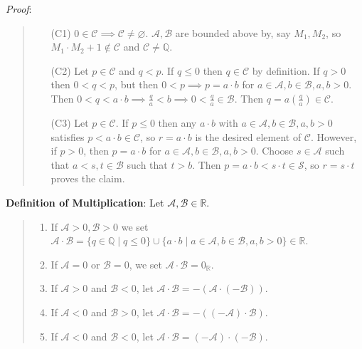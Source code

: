 \documentclass[11pt]{article}
\begin{document}
\emph{Proof}:
\begin{quote}\vspace{-0.3cm}
	\begin{enumerate}
	\item[(C1)] $0 \in \mathcal{C} \implies \mathcal{C} \neq \varnothing$. $\mathcal{A}, \mathcal{B}$ are bounded above by, say $M_1, M_2$, so $M_1 \cdot M_2 + 1 \notin \mathcal{C}$ and $\mathcal{C} \neq \mathbb{Q}$.
	\item[(C2)] Let $p \in \mathcal{C}$ and $q < p$. If $q \leq 0$ then $q \in \mathcal{C}$ by definition. If $q > 0$ then $0 < q < p$, but then $0 < p \implies p = a \cdot b$ for $a \in \mathcal{A}, b \in \mathcal{B}, a, b > 0$. Then $0 < q < a \cdot b \implies \frac{q}{a} < b \implies 0 < \frac{q}{a} \in \mathcal{B}$. Then $q = a(\frac{q}{a}) \in \mathcal{C}$.
	\item[(C3)] Let $p \in \mathcal{C}$. If $p \leq 0$ then any $a \cdot b$ with $a \in \mathcal{A}, b \in \mathcal{B}, a,b > 0$ satisfies $p < a \cdot b \in \mathcal{C}$, so $r = a \cdot b$ is the desired element of $\mathcal{C}$. However, if $p > 0$, then $p = a \cdot b$ for $a \in \mathcal{A}, b \in \mathcal{B}, a,b > 0$. Choose $s \in \mathcal{A}$ such that $a < s, t \in \mathcal{B}$ such that $t > b$. Then $p = a \cdot b < s \cdot t \in \mathcal{S}$, so $r = s \cdot t$ proves the claim.
	\end{enumerate}
\end{quote}

\textbf{Definition of Multiplication}: Let $\mathcal{A}, \mathcal{B} \in \mathbb{R}$.
\begin{quote}\vspace{-0.3cm}
	\begin{enumerate}
	\item If $\mathcal{A} > 0, \mathcal{B} > 0$ we set $\mathcal{A} \cdot \mathcal{B} = \{q \in \mathbb{Q} \mid q \leq 0\} \cup \{a \cdot b \mid a \in \mathcal{A}, b \in \mathcal{B}, a, b > 0\} \in \mathbb{R}$.
	\item If $\mathcal{A} = 0$ or $\mathcal{B} = 0$, we set $\mathcal{A} \cdot \mathcal{B} = 0_\mathbb{R}$.
	\item If $\mathcal{A} > 0$ and $\mathcal{B} < 0$, let $\mathcal{A} \cdot \mathcal{B} = - (\mathcal{A} \cdot (-\mathcal{B}))$.
	\item If $\mathcal{A} < 0$ and $\mathcal{B} > 0$, let $\mathcal{A} \cdot \mathcal{B} = -((-\mathcal{A}) \cdot \mathcal{B})$.
	\item If $\mathcal{A} < 0$ and $\mathcal{B} < 0$, let $\mathcal{A} \cdot \mathcal{B} = (-\mathcal{A}) \cdot (-\mathcal{B})$.
	\end{enumerate}
\end{quote}
\end{document}
